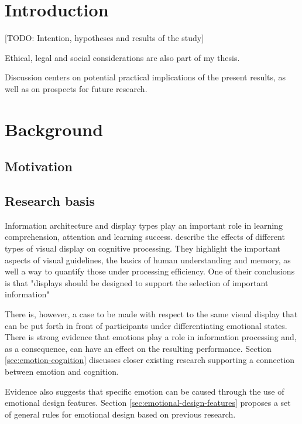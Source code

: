 \section{Introduction}

[TODO: Intention, hypotheses and results of the study]

Ethical, legal and social considerations are also part of my thesis.


Discussion centers on potential practical implications of the present results, as well as on prospects for future research.

\clearpage

\section{Background}

	\subsection{Motivation}
	
	
	
		
	\subsection{Research basis} \label{sec:research}
	
	
	Information architecture and display types play an important role in learning comprehension, attention and learning success. \cite{McCrudden2017} describe the effects of different types of visual display on cognitive processing. They highlight the important aspects of visual guidelines, the basics of human understanding and  memory, as well a way to quantify those under processing efficiency. One of their conclusions is that "displays should be designed to support the selection of important information" \cite[p.633]{McCrudden2017}
	
	There is, however, a case to be made with respect to the same visual display that can be put forth in front of participants under differentiating emotional states. There is strong evidence that emotions play a role in information processing and, as a consequence, can have an effect on the resulting performance. Section \ref{sec:emotion-cognition} discusses closer existing research supporting a connection between emotion and cognition.
	
	Evidence also suggests that specific emotion can be caused through the use of emotional design features. Section \ref{sec:emotional-design-features} proposes a set of general rules for emotional design based on previous research.
	
